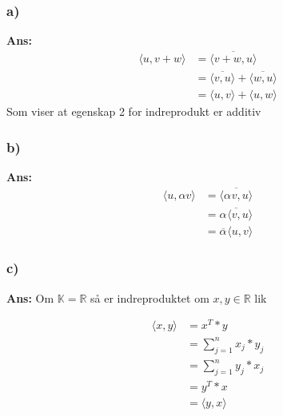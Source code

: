 \documentclass[11pt]{article}
\newenvironment{solbox}
  {\begin{mdframed}[linewidth=1pt,linecolor=black,roundcorner=5pt]
   \noindent\textbf{Ans: }\enspace}
  {\end{mdframed}}
\newcommand{\compconj}[1]{%
  \overline{#1}%
}
\begin{document}
\subsubsection{a)}

\begin{solbox}
    \begin{align*}
        \langle u, v+w \rangle &= \compconj{\langle v+w, u \rangle} \\
        &= \compconj{ \langle v, u \rangle } + \compconj{ \langle w, u \rangle } \\
        &= \langle u, v \rangle + \langle u, w \rangle 
    \end{align*}
    Som viser at egenskap 2 for indreprodukt er additiv

\end{solbox}


\subsubsection{b)}

\begin{solbox}
    \begin{align*}
        \langle u, \alpha  v\rangle &= \compconj{ \langle \alpha_{}^{} v, u \rangle } \\
        &= \compconj{ \alpha_{}^{} \langle v, u \rangle } \\
        &= \compconj{\alpha_{}^{} } \langle u, v \rangle 
    \end{align*}


    
\end{solbox}

\subsubsection{c)}
\begin{solbox}
    Om $ \mathbb{K} = \mathbb{R} $ så er indreproduktet om $ x, y \in \mathbb{R} $ lik
    
    \begin{align*}
        \langle x, y \rangle &= x^T * y \\
        &= \sum_{ j=1 }^{ n } x_j * y_j \\
        &= \sum_{ j=1 }^{ n } y_j * x_j \\
        &= y^T  * x \\
        &= \langle y, x \rangle 
    \end{align*}
    


\end{solbox}
\end{document}
